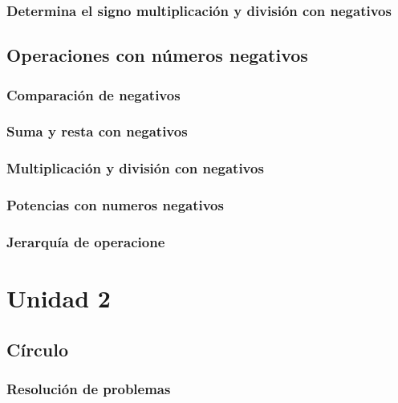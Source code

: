 \documentclass[12pt,addpoints,answers]{evalua}
\begin{document}
\begin{questions}
	\subsubsection{Determina el signo multiplicación y división con negativos}
	\question[1]{}

	\subsection   {Operaciones con números negativos}
	\subsubsection{Comparación de negativos}
	\question[1]{}
	\subsubsection{Suma y resta con negativos}
	\question[1]{}
	\subsubsection{Multiplicación y división con negativos}
	\question[1]{}
	\subsubsection{Potencias con numeros negativos}
	\question[1]{}
	\subsubsection{Jerarquía de operacione}
	\question[1]{}

	\section{Unidad 2}
	\subsection   {Círculo}
	\subsubsection{Resolución de problemas}
	\question[1]{}

\end{questions}
\end{document}

